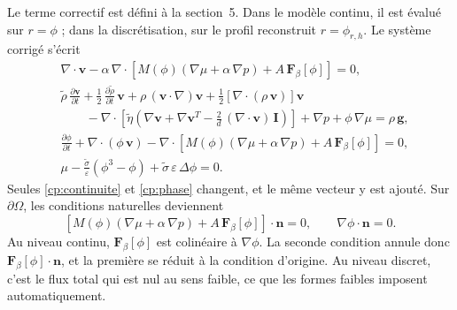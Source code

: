 Le terme correctif est défini à la section~5. Dans le modèle continu, il est évalué sur $r=\phi$ ; dans la discrétisation, sur le profil reconstruit $r=\phi_{r,h}$. Le système corrigé s'écrit
\begin{subequations}\label{cp:continu}
\begin{align}
  & \nabla\cdot\mathbf{v}
    - \alpha\,\nabla\cdot\left[M(\phi)\left(\nabla\mu + \alpha\,\nabla p\right) + A\,\mathbf{F}_\beta[\phi]\right] = 0,
    \label{cp:continuite}\\[4pt]
  & \tilde{\rho}\,\frac{\partial\mathbf{v}}{\partial t}
    + \frac{1}{2}\,\frac{\partial\tilde{\rho}}{\partial t}\,\mathbf{v}
    + \rho\,(\mathbf{v}\cdot\nabla)\mathbf{v}
    + \frac{1}{2}\left[\nabla\cdot(\rho\,\mathbf{v})\right]\mathbf{v}
    \nonumber\\
  & \qquad
    - \nabla\cdot\left[\tilde{\eta}\left(\nabla\mathbf{v} + \nabla\mathbf{v}^{T}
      - \frac{2}{d}\,(\nabla\cdot\mathbf{v})\,\mathbf{I}\right)\right]
    + \nabla p + \phi\,\nabla\mu = \rho\,\mathbf{g},
    \label{cp:qdm}\\[4pt]
  & \frac{\partial\phi}{\partial t} + \nabla\cdot\left(\phi\,\mathbf{v}\right)
    - \nabla\cdot\left[M(\phi)\left(\nabla\mu + \alpha\,\nabla p\right) + A\,\mathbf{F}_\beta[\phi]\right] = 0,
    \label{cp:phase}\\[4pt]
  & \mu - \frac{\tilde{\sigma}}{\varepsilon}\left(\phi^{3}-\phi\right) + \tilde{\sigma}\,\varepsilon\,\Delta\phi = 0 .
    \label{cp:potentiel}
\end{align}
\end{subequations}
Seules \eqref{cp:continuite} et \eqref{cp:phase} changent, et le même vecteur y est ajouté. Sur $\partial\Omega$, les conditions naturelles deviennent
\begin{equation}
  \left[M(\phi)\left(\nabla\mu + \alpha\,\nabla p\right) + A\,\mathbf{F}_\beta[\phi]\right]\cdot\mathbf{n} = 0,
  \qquad
  \nabla\phi\cdot\mathbf{n} = 0 .
\end{equation}
Au niveau continu, $\mathbf{F}_\beta[\phi]$ est colinéaire à $\nabla\phi$. La seconde condition annule donc $\mathbf{F}_\beta[\phi]\cdot\mathbf{n}$, et la première se réduit à la condition d'origine. Au niveau discret, c'est le flux total qui est nul au sens faible, ce que les formes faibles imposent automatiquement.

